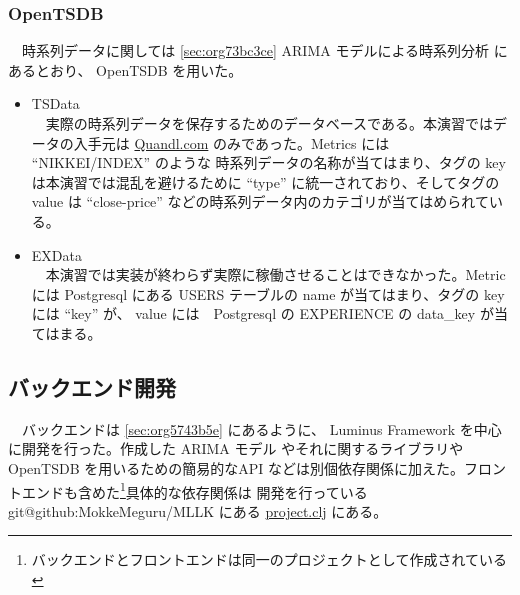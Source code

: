 \documentclass{scrartcl}
\begin{document}
\subsubsection{OpenTSDB}
\label{sec:org29139dc}
　時系列データに関しては \ref{sec:org73bc3ce} ARIMA モデルによる時系列分析 にあるとおり、 OpenTSDB を用いた。\\
\begin{itemize}
\item TSData\\
　実際の時系列データを保存するためのデータベースである。本演習ではデータの入手元は \href{https://www.quandl.com/}{Quandl.com} のみであった。Metrics には ``NIKKEI/INDEX'' のような 時系列データの名称が当てはまり、タグの key は本演習では混乱を避けるために ``type'' に統一されており、そしてタグの value は ``close-price'' などの時系列データ内のカテゴリが当てはめられている。\\
\item EXData\\
　本演習では実装が終わらず実際に稼働させることはできなかった。Metric には Postgresql にある USERS テーブルの name が当てはまり、タグの key には ``key'' が、 value には　Postgresql の EXPERIENCE の data\_key が当てはまる。\\
\end{itemize}

\subsection{バックエンド開発}
\label{sec:orgb2023a0}
　バックエンドは \ref{sec:org5743b5e} にあるように、 Luminus Framework を中心に開発を行った。作成した ARIMA モデル やそれに関するライブラリや OpenTSDB を用いるための簡易的なAPI などは別個依存関係に加えた。フロントエンドも含めた\footnote{バックエンドとフロントエンドは同一のプロジェクトとして作成されている}具体的な依存関係は 開発を行っている git@github:MokkeMeguru/MLLK にある \href{https://github.com/MokkeMeguru/MLLK/blob/master/project.clj}{project.clj} にある。\\
\end{document}
